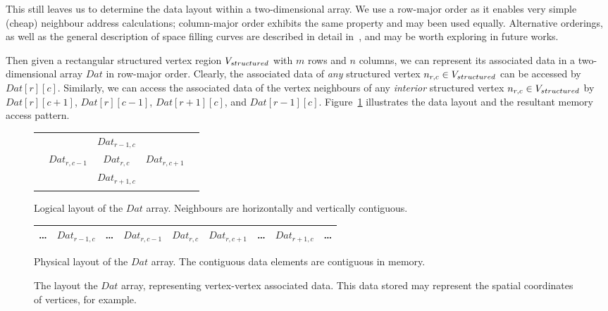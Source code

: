 This still leaves us to determine the data layout within a two-dimensional array. We use a row-major order as it enables very simple (cheap) neighbour address calculations; column-major order exhibits the same property and may been used equally. Alternative orderings, as well as the general description of space filling curves are described in detail in~\cite{samet2006foundations}, and may be worth exploring in future works.

Then given a rectangular structured vertex region $V_{structured}$ with $m$ rows and $n$ columns, we can represent its associated data in a two-dimensional array $Dat$ in row-major order. Clearly, the associated data of \emph{any} structured vertex $n_{r,c} \in V_{structured}$ can be accessed by $Dat[r][c]$. Similarly, we can access the associated data of the vertex neighbours of any \emph{interior} structured vertex $n_{r,c} \in V_{structured}$ by $Dat[r][c+1]$, $Dat[r][c-1]$, $Dat[r+1][c]$, and $Dat[r-1][c]$. Figure~\ref{fig:array-layout} illustrates the data layout and the resultant memory access pattern.


\begin{figure}
\sidebysidevertical
{
	\begin{tabular}{c|c|c|c|c}
	 &               &               &               & \\ \hline \rowcolor{yellow!40}
	 &               & $Dat_{r-1,c}$ &               & \\ \hline \rowcolor{green!40}
	 & $Dat_{r,c-1}$ & $Dat_{r,c}$   & $Dat_{r,c+1}$ & \\ \hline \rowcolor{red!40}
	 &               & $Dat_{r+1,c}$ &               & \\ \hline
	 &               &               &               &
	\end{tabular}
	\caption{Logical layout of the $Dat$ array. Neighbours are horizontally and vertically contiguous.}
}
{
	\begin{tabular}{c|c|c|c|c|c|c|c|c}
	\hline
	\ldots & \cellcolor{yellow!40} $Dat_{r-1,c}$ &
	\ldots & \cellcolor{green!40} $Dat_{r,c-1}$ & \cellcolor{green!40} $Dat_{r,c}$ & \cellcolor{green!40} $Dat_{r,c+1}$ &
	\ldots & \cellcolor{red!40} $Dat_{r+1,c}$ &
	\ldots \\
	\hline
	\end{tabular}
	\caption{Physical layout of the $Dat$ array. The contiguous data elements are contiguous in memory.}
}
\caption{The layout the $Dat$ array, representing vertex-vertex associated data. This data stored may represent the spatial coordinates of vertices, for example.}
\label{fig:array-layout}
\end{figure}



